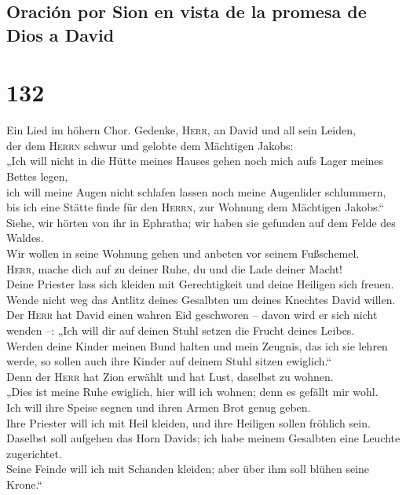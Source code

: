 \hypertarget{oraciuxf3n-por-sion-en-vista-de-la-promesa-de-dios-a-david}{%
\subsection{Oración por Sion en vista de la promesa de Dios a
David}\label{oraciuxf3n-por-sion-en-vista-de-la-promesa-de-dios-a-david}}

\hypertarget{section-131}{%
\section{132}\label{section-131}}

 Ein Lied im höhern Chor. Gedenke, \textsc{Herr}, an David
und all sein Leiden,\\
 der dem \textsc{Herrn} schwur und gelobte dem Mächtigen
Jakobs:\\
 „Ich will nicht in die Hütte meines Hauses gehen noch
mich aufs Lager meines Bettes legen,\\
 ich will meine Augen nicht schlafen lassen noch meine
Augenlider schlummern,\\
 bis ich eine Stätte finde für den \textsc{Herrn}, zur
Wohnung dem Mächtigen Jakobs.``\\
 Siehe, wir hörten von ihr in Ephratha; wir haben sie
gefunden auf dem Felde des Waldes.\\
 Wir wollen in seine Wohnung gehen und anbeten vor seinem
Fußschemel.\\
 \textsc{Herr}, mache dich auf zu deiner Ruhe, du und die
Lade deiner Macht!\\
 Deine Priester lass sich kleiden mit Gerechtigkeit und
deine Heiligen sich freuen.\\
 Wende nicht weg das Antlitz deines Gesalbten um deines
Knechtes David willen.\\
 Der \textsc{Herr} hat David einen wahren Eid geschworen
-- davon wird er sich nicht wenden --: „Ich will dir auf deinen Stuhl
setzen die Frucht deines Leibes.\\
 Werden deine Kinder meinen Bund halten und mein Zeugnis,
das ich sie lehren werde, so sollen auch ihre Kinder auf deinem Stuhl
sitzen ewiglich.``\\
 Denn der \textsc{Herr} hat Zion erwählt und hat Lust,
daselbst zu wohnen.\\
 „Dies ist meine Ruhe ewiglich, hier will ich wohnen;
denn es gefällt mir wohl.\\
 Ich will ihre Speise segnen und ihren Armen Brot genug
geben.\\
 Ihre Priester will ich mit Heil kleiden, und ihre
Heiligen sollen fröhlich sein.\\
 Daselbst soll aufgehen das Horn Davids; ich habe meinem
Gesalbten eine Leuchte zugerichtet.\\
 Seine Feinde will ich mit Schanden kleiden; aber über
ihm soll blühen seine Krone.``

